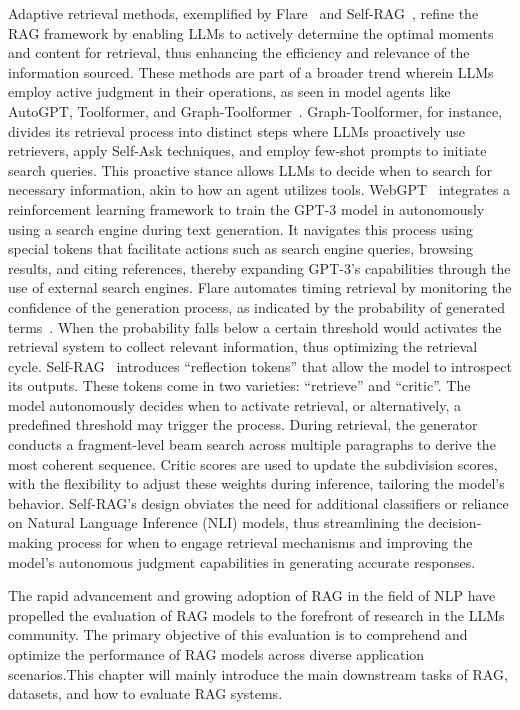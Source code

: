 Adaptive retrieval methods, exemplified by Flare~ and Self-RAG~, refine the RAG framework by enabling LLMs to actively determine the optimal moments and content for retrieval, thus enhancing the efficiency and relevance of the information sourced.
These methods are part of a broader trend wherein LLMs employ active judgment in their operations, as seen in model agents like AutoGPT, Toolformer, and Graph-Toolformer~. Graph-Toolformer, for instance, divides its retrieval process into distinct steps where LLMs proactively use retrievers, apply Self-Ask techniques, and employ few-shot prompts to initiate search queries. This proactive stance allows LLMs to decide when to search for necessary information, akin to how an agent utilizes tools.
WebGPT~ integrates a reinforcement learning framework to train the GPT-3 model in autonomously using a search engine during text generation. It navigates this process using special tokens that facilitate actions such as search engine queries, browsing results, and citing references, thereby expanding GPT-3's capabilities through the use of external search engines. Flare automates timing retrieval by monitoring the confidence of the generation process, as indicated by the probability of generated terms~. When the probability falls below a certain threshold would activates the retrieval system to collect relevant information, thus optimizing the retrieval cycle. Self-RAG~ introduces ``reflection tokens'' that allow the model to introspect its outputs. These tokens come in two varieties: ``retrieve'' and ``critic''. The model autonomously decides when to activate retrieval, or alternatively, a predefined threshold may trigger the process. During retrieval, the generator conducts a fragment-level beam search across multiple paragraphs to derive the most coherent sequence. Critic scores are used to update the subdivision scores, with the flexibility to adjust these weights during inference, tailoring the model's behavior. Self-RAG's design obviates the need for additional classifiers or reliance on Natural Language Inference (NLI) models, thus streamlining the decision-making process for when to engage retrieval mechanisms and improving the model's autonomous judgment capabilities in generating accurate responses.

\label{sec:evaluation}
The rapid advancement and growing adoption of RAG in the field of  NLP have propelled the evaluation of RAG models to the forefront of research in the LLMs community. The primary objective of this evaluation is to comprehend and optimize the performance of RAG models across diverse application scenarios.This chapter will mainly introduce the main downstream tasks of RAG, datasets, and how to evaluate RAG systems.

